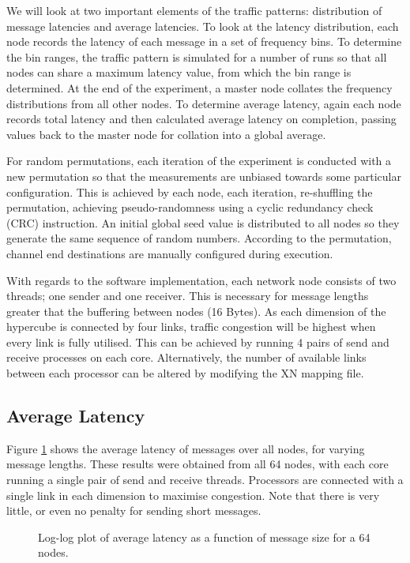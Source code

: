 We will look at two important elements of the traffic patterns: distribution of
message latencies and average latencies. To look at the latency distribution,
each node records the latency of each message in a set of frequency bins. To
determine the bin ranges, the traffic pattern is simulated for a number of runs
so that all nodes can share a maximum latency value, from which the bin range is
determined. At the end of the experiment, a master node collates the frequency
distributions from all other nodes. To determine average latency, again each
node records total latency and then calculated average latency on completion,
passing values back to the master node for collation into a global average.

For random permutations, each iteration of the experiment is conducted with a
new permutation so that the measurements are unbiased towards some particular
configuration. This is achieved by each node, each iteration, re-shuffling the
permutation, achieving pseudo-randomness using a cyclic redundancy check (CRC)
instruction. An initial global seed value is distributed to all nodes so they
generate the same sequence of random numbers. According to the permutation,
channel end destinations are manually configured during execution.

With regards to the software implementation, each network node consists of two
threads; one sender and one receiver.  This is necessary for message lengths
greater that the buffering between nodes (16 Bytes). As each dimension of the
hypercube is connected by four links, traffic congestion will be highest when
every link is fully utilised. This can be achieved by running 4 pairs of send
and receive processes on each core.  Alternatively, the number of available
links between each processor can be altered by modifying the XN mapping file.

\subsection{Average Latency}

Figure \ref{fig:avglatency} shows the average latency of messages over all
nodes, for varying message lengths. These results were obtained from all 64
nodes, with each core running a single pair of send and receive threads.
Processors are connected with a single link in each dimension to maximise
congestion. Note that there is very little, or even no penalty for sending short
messages.

\begin{figure}
\centering


\caption{Log-log plot of average latency as a function of message size for a 64
nodes.}

\label{fig:avglatency}
\end{figure}

